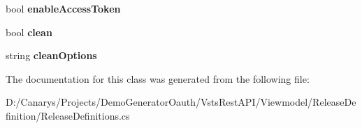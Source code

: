 \begin{DoxyCompactItemize}
\item 
\mbox{\label{class_vsts_rest_a_p_i_1_1_viewmodel_1_1_release_definition_1_1_release_definitions_1_1_deployment_input_abb2c85247f0b6df51db8d23f6954a629}} 
bool {\bfseries enable\+Access\+Token}
\item 
\mbox{\label{class_vsts_rest_a_p_i_1_1_viewmodel_1_1_release_definition_1_1_release_definitions_1_1_deployment_input_a69664154235b5cca6627459fbe6b8301}} 
bool {\bfseries clean}
\item 
\mbox{\label{class_vsts_rest_a_p_i_1_1_viewmodel_1_1_release_definition_1_1_release_definitions_1_1_deployment_input_a2024cac2e40ae3086044aaedf7d0a76e}} 
string {\bfseries clean\+Options}
\end{DoxyCompactItemize}


The documentation for this class was generated from the following file\+:\begin{DoxyCompactItemize}
\item 
D\+:/\+Canarys/\+Projects/\+Demo\+Generator\+Oauth/\+Vsts\+Rest\+A\+P\+I/\+Viewmodel/\+Release\+Definition/Release\+Definitions.\+cs\end{DoxyCompactItemize}
